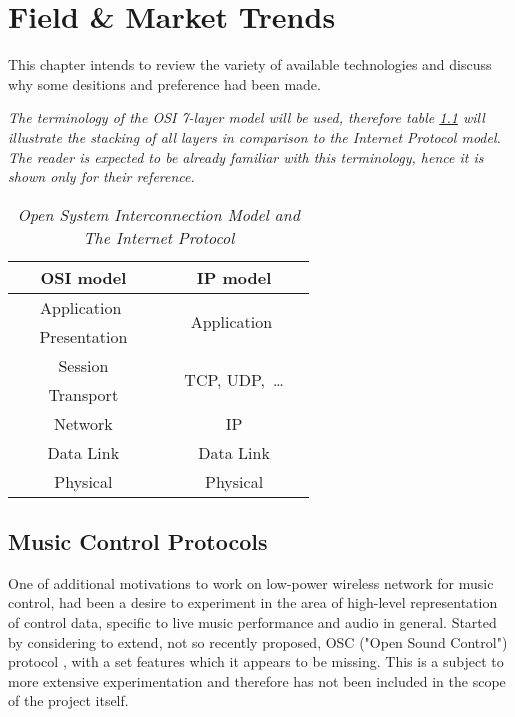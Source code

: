 \chapter{Field \& Market Trends}

 This chapter intends to review the variety of available
 technologies and discuss why some desitions and preference
 had been made.

 \emph{The terminology of the OSI 7-layer model will be used,
 therefore table \ref{tab:osi} will illustrate the stacking
 of all layers in comparison to the Internet Protocol model.
 The reader is expected to be already familiar with this
 terminology, hence it is shown only for their reference.}

\begin{table}[h]
\begin{center}
 \begin{tabular}{|c||c|}
 \hline
 {\bf OSI model}&{\bf IP model}\\
 \hline \hline
 \ \ \  Application \ \ \   & \multirow{2}{*}{ \ \ \   Application \ \ \ }   \\
 \cline{1-1}
 Presentation & \\
 \hline
 Session & \multirow{2}{*}{TCP, UDP,\  \dots }\\
 \cline{1-1}
 Transport & \\
 \hline
 Network & IP\\
 \hline
 Data Link & Data Link\\
 \hline
 Physical & Physical\\
 \hline
 \end{tabular}
 \end{center}
\caption{\emph{Open System Interconnection Model
	and The Internet Protocol}}\label{tab:osi}
\end{table}


\section{Music Control Protocols}

   One of additional motivations to work on low-power wireless
  network for music control, had been a desire to experiment in
  the area of high-level representation of control data, specific
  to live music performance and audio in general.
  Started by considering to extend, not so recently proposed, OSC
  ("Open Sound Control") protocol \cite{paper:osc11}, with a set
  features which it appears to be missing. This is a subject to
  more extensive experimentation and therefore has not been
  included in the scope of the project itself.

